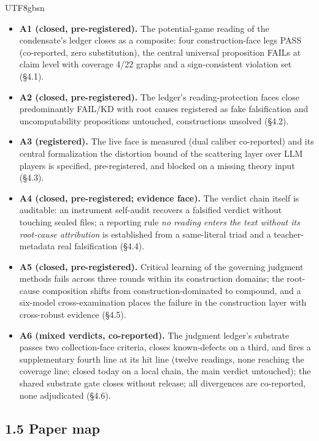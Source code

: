 \documentclass[11pt,letterpaper]{article}
\begin{document}
\begin{CJK}{UTF8}{gbsn}
\begin{itemize}
\item \textbf{A1 (closed, pre-registered).} The potential-game reading of the condensate's ledger closes as a composite: four construction-face legs PASS (co-reported, zero substitution), the central universal proposition FAILs at claim level with coverage 4/22 graphs and a sign-consistent violation set (\S{}4.1).
\item \textbf{A2 (closed, pre-registered).} The ledger's reading-protection faces close predominantly FAIL/KD with root causes registered as fake falsification and uncomputability \textemdash{} propositions untouched, constructions unsolved (\S{}4.2).
\item \textbf{A3 (registered).} The live face is measured (dual caliber co-reported) and its central formalization \textemdash{} the distortion bound of the scattering layer over LLM players \textemdash{} is specified, pre-registered, and blocked on a missing theory input (\S{}4.3).
\item \textbf{A4 (closed, pre-registered; evidence face).} The verdict chain itself is auditable: an instrument self-audit recovers a falsified verdict without touching sealed files; a reporting rule \textemdash{} \emph{no reading enters the text without its root-cause attribution} \textemdash{} is established from a same-literal triad and a teacher-metadata real falsification (\S{}4.4).
\item \textbf{A5 (closed, pre-registered).} Critical learning of the governing judgment methods fails across three rounds within its construction domains; the root-cause composition shifts from construction-dominated to compound, and a six-model cross-examination places the failure in the construction layer with cross-robust evidence (\S{}4.5).
\item \textbf{A6 (mixed verdicts, co-reported).} The judgment ledger's substrate passes two collection-face criteria, closes known-defects on a third, and fires a supplementary fourth line at its hit line (twelve readings, none reaching the coverage line; closed today on a local chain, the main verdict untouched); the shared substrate gate closes without release; all divergences are co-reported, none adjudicated (\S{}4.6).
\end{itemize}

\subsection*{1.5 Paper map}


\end{CJK}
\end{document}
